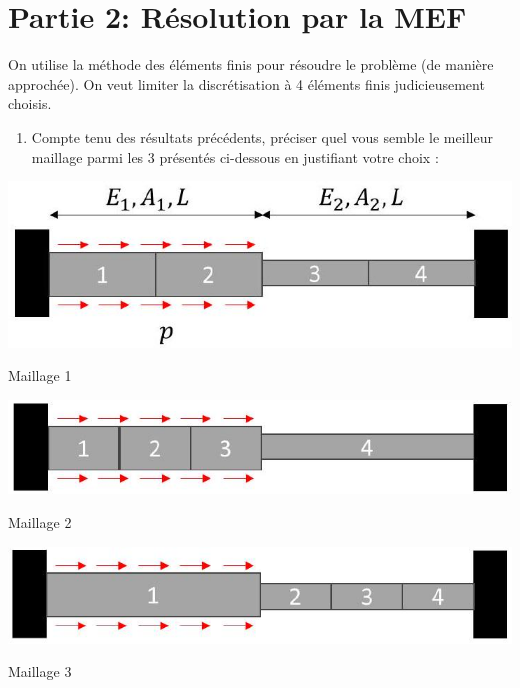 \documentclass[11pt,a4paper]{report}
\begin{document}
\section*{Partie 2: Résolution par la MEF}
On utilise la méthode des éléments finis pour résoudre le problème (de manière approchée). On veut limiter la discrétisation à 4 éléments finis judicieusement choisis.\\

\begin{enumerate}[start=6]
  \item Compte tenu des résultats précédents, préciser quel vous semble le meilleur maillage parmi les 3 présentés ci-dessous en justifiant votre choix :
\end{enumerate}

\begin{center}
\includegraphics[max width=\textwidth, center]{2025_10_03_26e11264345fd9bad5cag-1(1)}
\end{center}
Maillage 1
\begin{center}
\includegraphics[max width=\textwidth, center]{2025_10_03_26e11264345fd9bad5cag-1}
\end{center}

Maillage 2
\begin{center}
\includegraphics[max width=\textwidth, center]{2025_10_03_26e11264345fd9bad5cag-1(3)}
\end{center}

Maillage 3
\end{document}
